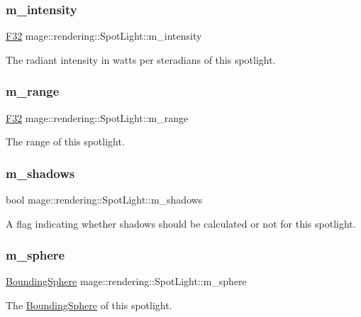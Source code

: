 \subsubsection{\texorpdfstring{m\+\_\+intensity}{m\_intensity}}
{\footnotesize\ttfamily \hyperlink{namespacemage_aa97e833b45f06d60a0a9c4fc22ae02c0}{F32} mage\+::rendering\+::\+Spot\+Light\+::m\+\_\+intensity\hspace{0.3cm}{\ttfamily [private]}}

The radiant intensity in watts per steradians of this spotlight. \hypertarget{classmage_1_1rendering_1_1_spot_light_a83027e02fbeee3ee5698ebb498ff30be}{}\label{classmage_1_1rendering_1_1_spot_light_a83027e02fbeee3ee5698ebb498ff30be} 
\subsubsection{\texorpdfstring{m\+\_\+range}{m\_range}}
{\footnotesize\ttfamily \hyperlink{namespacemage_aa97e833b45f06d60a0a9c4fc22ae02c0}{F32} mage\+::rendering\+::\+Spot\+Light\+::m\+\_\+range\hspace{0.3cm}{\ttfamily [private]}}

The range of this spotlight. \hypertarget{classmage_1_1rendering_1_1_spot_light_aa2e1e955cf9fb12a9e064cc523cbbe26}{}\label{classmage_1_1rendering_1_1_spot_light_aa2e1e955cf9fb12a9e064cc523cbbe26} 
\subsubsection{\texorpdfstring{m\+\_\+shadows}{m\_shadows}}
{\footnotesize\ttfamily bool mage\+::rendering\+::\+Spot\+Light\+::m\+\_\+shadows\hspace{0.3cm}{\ttfamily [private]}}

A flag indicating whether shadows should be calculated or not for this spotlight. \hypertarget{classmage_1_1rendering_1_1_spot_light_a24667e6bec37a402627c20283795de95}{}\label{classmage_1_1rendering_1_1_spot_light_a24667e6bec37a402627c20283795de95} 
\subsubsection{\texorpdfstring{m\+\_\+sphere}{m\_sphere}}
{\footnotesize\ttfamily \hyperlink{classmage_1_1_bounding_sphere}{Bounding\+Sphere} mage\+::rendering\+::\+Spot\+Light\+::m\+\_\+sphere\hspace{0.3cm}{\ttfamily [private]}}

The \hyperlink{classmage_1_1_bounding_sphere}{Bounding\+Sphere} of this spotlight. 